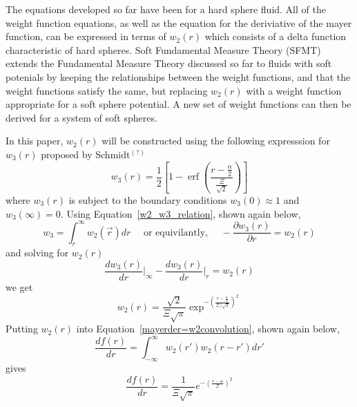 \documentclass[12pt]{article}
\begin{document}
The equations developed so far have been for a hard sphere fluid. All of the weight function equations, as well as the equation for the deriviative of the mayer function, can be expressed in terms of $w_{2}(r)$ which consists of a delta function characteristic of hard spheres. Soft Fundamental Measure Theory (SFMT) extends the Fundamental Measure Theory discussed so far to fluids with soft potenials by keeping the relationships between the weight functions, and that the weight functions satisfy the same, but replacing $w_{2}(r)$ with a weight function appropriate for a soft sphere potential. A new set of weight functions can then be derived for a system of soft spheres. 

In this paper,  $w_{2}(r)$ will be constructed using the following expresssion for $w_3(r)$ proposed by Schmidt$^{(?)}$ 
\begin{equation}{w_3(r)=\frac{1}{2}}\left[1-\operatorname{erf}\left(\frac{r-\frac{\alpha}{2}}{\frac{\Xi}{\sqrt{2}}}\right)\right]\end{equation} 
 where $w_3(r)$ is subject to the boundary conditions $w_3(0)\approx{1}$ and $w_3(\infty)=0$. 
Using Equation~\ref{w2_w3_relation}, shown again below, 
\begin{displaymath}{w_{3}=\int_{r}^{\infty}{w_{2}(\vec{r})dr}\mbox{~~~~or equivilantly,~~~~}-\frac{\partial{w_3(r)}}{\partial{r}}=w_2(r)}\end{displaymath}
and solving for $w_2(r)$
\begin{displaymath}{\frac{dw_3(r)}{dr}\bigg|_{\infty}-\frac{dw_3(r)}{dr}\bigg|_{r}=w_2(r)}\end{displaymath} 
we get \begin{equation}{ w_2(r)=\frac{\sqrt{2}}{\Xi\sqrt\pi}\exp^{-\left(\frac{r-\frac{\alpha}{2}}{\Xi/\sqrt{2}}\right)^2} }\end{equation} %
Putting $w_2(r)$ into Equation~\ref{mayerder=w2convolution}, shown again below, 
\begin{displaymath}{\frac{df(r)}{dr}=\int_{-\infty}^{\infty}{w_2(r')w_2(r-r')dr'}}\end{displaymath}
gives
\begin{equation}{\frac{df(r)}{dr}=\frac{1}{\Xi\sqrt{\pi}}e^{-\left(\frac{r-\alpha}{\Xi}\right)^2}}\end{equation} 
\end{document}
